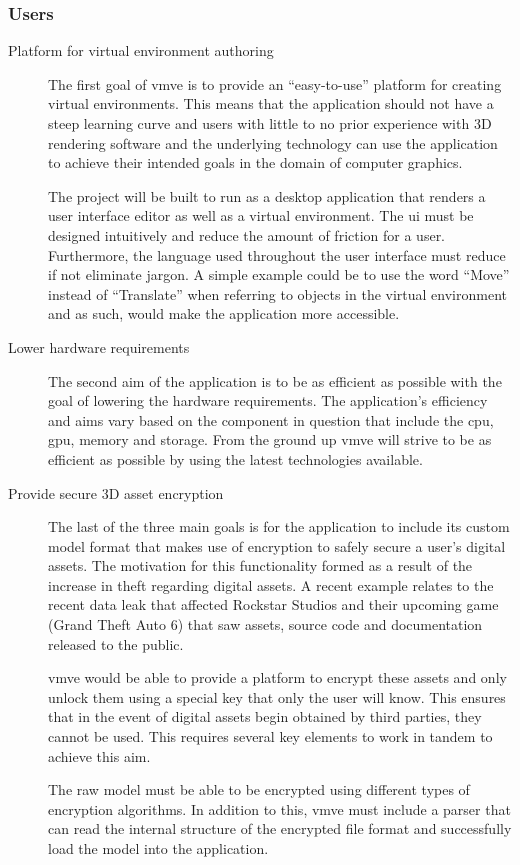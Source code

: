\documentclass[11pt]{article}
\begin{document}
\subsubsection{Users}
\begin{description}
  \item[Platform for virtual environment authoring] The first goal of
    \gls*{vmve} is to provide an ``easy-to-use'' platform for creating virtual
    environments. This means that the application should not have a steep
    learning curve and users with little to no prior experience with 3D
    rendering software and the underlying technology can use the application to
    achieve their intended goals in the domain of computer graphics. 

    The project will be built to run as a desktop application that renders a
    user interface editor as well as a virtual environment. The \gls*{ui} must
    be designed intuitively and reduce the amount of friction for a user.
    Furthermore, the language used throughout the user interface must reduce if
    not eliminate jargon. A simple example could be to use the word ``Move''
    instead of ``Translate'' when referring to objects in the virtual
    environment and as such, would make the application more accessible.

  \item[Lower hardware requirements] The second aim of the application is to be
    as efficient as possible with the goal of lowering the hardware
    requirements. The application's efficiency and aims vary based on the
    component in question that include the \gls*{cpu}, \gls*{gpu}, memory and
    storage. From the ground up \gls*{vmve} will strive to be as efficient as
    possible by using the latest technologies available.

  \item[Provide secure 3D asset encryption] The last of the three main goals is
    for the application to include its custom model format that makes use of
    encryption to safely secure a user's digital assets. The motivation for
    this functionality formed as a result of the increase in theft regarding
    digital assets. A recent example relates to the recent data leak that
    affected Rockstar Studios and their upcoming game (Grand Theft Auto 6)
    \cite{gta_leak} that saw assets, source code and documentation released to
    the public.
    
    \gls*{vmve} would be able to provide a platform to encrypt these assets and
    only unlock them using a special key that only the user will know. This
    ensures that in the event of digital assets begin obtained by third parties,
    they cannot be used. This requires several key elements to work in tandem to
    achieve this aim.
    
    The raw model must be able to be encrypted using different types of encryption
    algorithms. In addition to this, \gls*{vmve} must include a parser that can read
    the internal structure of the encrypted file format and successfully load the
    model into the application.
\end{description}
\end{document}
